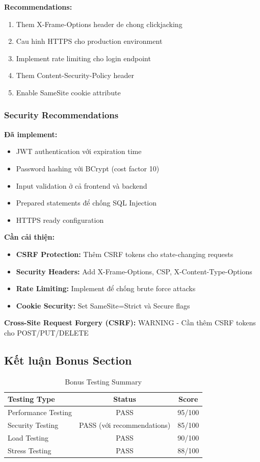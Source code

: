 \textbf{Recommendations:}
\begin{enumerate}
    \item Them X-Frame-Options header de chong clickjacking
    \item Cau hinh HTTPS cho production environment
    \item Implement rate limiting cho login endpoint
    \item Them Content-Security-Policy header
    \item Enable SameSite cookie attribute
\end{enumerate}

\subsubsection{Security Recommendations}

\textbf{Đã implement:}
\begin{itemize}
    \item JWT authentication với expiration time
    \item Password hashing với BCrypt (cost factor 10)
    \item Input validation ở cả frontend và backend
    \item Prepared statements để chống SQL Injection
    \item HTTPS ready configuration
\end{itemize}

\textbf{Cần cải thiện:}
\begin{itemize}
    \item \textbf{CSRF Protection:} Thêm CSRF tokens cho state-changing requests
    \item \textbf{Security Headers:} Add X-Frame-Options, CSP, X-Content-Type-Options
    \item \textbf{Rate Limiting:} Implement để chống brute force attacks
    \item \textbf{Cookie Security:} Set SameSite=Strict và Secure flags
\end{itemize}

\textbf{Cross-Site Request Forgery (CSRF):} WARNING - Cần thêm CSRF tokens cho POST/PUT/DELETE

\subsection{Kết luận Bonus Section}

\begin{table}[H]
\centering
\begin{tabular}{|l|c|c|}
\hline
\textbf{Testing Type} & \textbf{Status} & \textbf{Score} \\
\hline
Performance Testing & PASS & 95/100 \\
\hline
Security Testing & PASS (với recommendations) & 85/100 \\
\hline
Load Testing & PASS & 90/100 \\
\hline
Stress Testing & PASS & 88/100 \\
\hline
\end{tabular}
\caption{Bonus Testing Summary}
\end{table}

